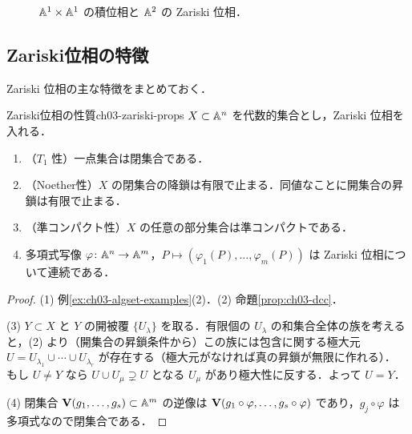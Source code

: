 \begin{figure}[H]
\centering
{}
\caption{$\mathbb{A}^1\times\mathbb{A}^1$ の積位相と $\mathbb{A}^2$ の Zariski 位相．}
\label{fig:ch03-product}
\end{figure}

\subsection{Zariski位相の特徴}

Zariski 位相の主な特徴をまとめておく．

\begin{myprop}{Zariski位相の性質}{ch03-zariski-props}
$X\subset\mathbb{A}^n$ を代数的集合とし，Zariski 位相を入れる．
\begin{enumerate}
  \item（$T_1$ 性）一点集合は閉集合である．
  \item（Noether性）$X$ の閉集合の降鎖は有限で止まる．同値なことに開集合の昇鎖は有限で止まる．
  \item（準コンパクト性）$X$ の任意の部分集合は準コンパクトである．
  \item 多項式写像 $\varphi\colon\mathbb{A}^n\to\mathbb{A}^m$，$P\mapsto(\varphi_1(P),\dots,\varphi_m(P))$ は Zariski 位相について連続である．
\end{enumerate}
\end{myprop}

\begin{proof}
(1) 例\ref{ex:ch03-algset-examples}(2)．(2) 命題\ref{prop:ch03-dcc}．

(3) $Y\subset X$ と $Y$ の開被覆 $\{U_\lambda\}$ を取る．有限個の $U_\lambda$ の和集合全体の族を考えると，(2) より（開集合の昇鎖条件から）この族には包含に関する極大元 $U=U_{\lambda_1}\cup\cdots\cup U_{\lambda_r}$ が存在する（極大元がなければ真の昇鎖が無限に作れる）．
もし $U\ne Y$ なら $U\cup U_\mu\supsetneq U$ となる $U_\mu$ があり極大性に反する．よって $U=Y$．

(4) 閉集合 $\mathbf{V}(g_1,\dots,g_s)\subset\mathbb{A}^m$ の逆像は $\mathbf{V}(g_1\circ\varphi,\dots,g_s\circ\varphi)$ であり，$g_j\circ\varphi$ は多項式なので閉集合である．
\end{proof}

